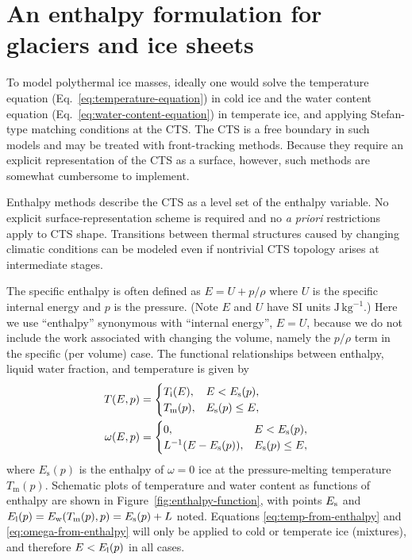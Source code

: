 \documentclass[parskip=half]{scrartcl}
\begin{document}
\section{An enthalpy formulation for glaciers and ice sheets}

To model polythermal ice masses, ideally one would solve the
temperature equation (Eq.~\ref{eq:temperature-equation}) in cold ice
and the water content equation (Eq.~\ref{eq:water-content-equation})
in temperate ice, and applying Stefan-type matching conditions at the
CTS. The CTS is a free boundary in such models and may be treated with
front-tracking methods.  Because they require an explicit
representation of the CTS as a surface, however, such methods are
somewhat cumbersome to implement.

Enthalpy methods describe the CTS as a level set of the enthalpy
variable.  No explicit surface-representation scheme is required and
no \emph{a priori} restrictions apply to CTS shape.  Transitions
between thermal structures caused by changing climatic conditions can
be modeled even if nontrivial CTS topology arises at intermediate
stages.

The specific enthalpy is often defined as $E = U + p/\rho$ where $U$
is the specific internal energy and $p$ is the pressure.  (Note $E$
and $U$ have SI units $\text{J}\,\text{kg}^{-1}$.) Here we use
``enthalpy'' synonymous with ``internal energy'', $E=U$, because we do
not include the work associated with changing the volume, namely the
$p/\rho$ term in the specific (per volume) case. The functional
relationships between enthalpy, liquid water fraction, and temperature
is given by
\begin{align}
\label{eq:temp-from-enthalpy} T(E,p) &= \begin{cases} T_{\text i}(E),
& E < E_{\text s}(p), \\ T_{\text m}(p), & E_{\text s}(p) \le E,
        \end{cases} \\
\label{eq:omega-from-enthalpy} \omega(E,p) &= \begin{cases} 0, & E <
E_{\text s}(p), \\ L^{-1} ( E-E_\text{s}(p) ), & E_{\text s}(p) \le E,
        \end{cases}
\end{align} where $E_{\text{s}}(p)$ is the enthalpy of $\omega=0$ ice
at the pressure-melting temperature $T_{\text{m}}(p)$. Schematic plots
of temperature and water content as functions of enthalpy are shown in
Figure~\ref{fig:enthalpy-function}, with points $E_{\text s}$ and
$E_{\text l}(p) = E_{\text w}(T_{\text m}(p),p) = E_{\text s}(p) + L$
noted.  Equations \eqref{eq:temp-from-enthalpy} and
\eqref{eq:omega-from-enthalpy} will only be applied to cold or
temperate ice (mixtures), and therefore $E<E_{\text l}(p)$ in all
cases.
\end{document}
